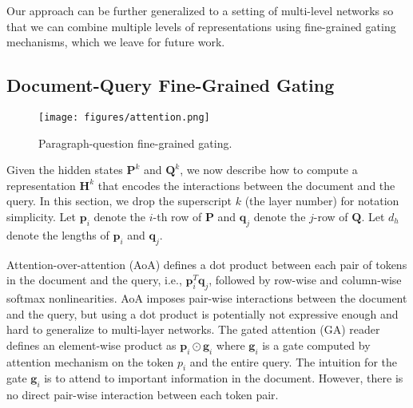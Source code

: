\documentclass{article} \usepackage{iclr2017_conference,times}
\begin{document}
Our approach can be further generalized to a setting of multi-level networks so that we can combine multiple levels of representations using fine-grained gating mechanisms, which we leave for future work.

\subsection{Document-Query Fine-Grained Gating} \label{sec:pq}

\begin{figure}[t]
\begin{center}
\texttt{[image: figures/attention.png]}
\end{center}
\caption{\small Paragraph-question fine-grained gating.}
\label{fig:dq}
\end{figure}

Given the hidden states $\mathbf{P}^k$ and $\mathbf{Q}^k$, we now describe how to compute a representation $\mathbf{H}^k$ that encodes the interactions between the document and the query. In this section, we drop the superscript $k$ (the layer number) for notation simplicity. Let $\mathbf{p}_i$ denote the $i$-th row of $\mathbf{P}$ and $\mathbf{q}_j$ denote the $j$-row of $\mathbf{Q}$. Let $d_h$ denote the lengths of $\mathbf{p}_i$ and $\mathbf{q}_j$.

Attention-over-attention (AoA) \citep{cui2016attention} defines a dot product between each pair of tokens in the document and the query, i.e., $\mathbf{p}_i^T \mathbf{q}_j$, followed by row-wise and column-wise softmax nonlinearities. AoA imposes pair-wise interactions between the document and the query, but using a dot product is potentially not expressive enough and hard to generalize to multi-layer networks. The gated attention (GA) reader \citep{dhingra2016gated} defines an element-wise product as $\mathbf{p}_i \odot \mathbf{g}_i$ where $\mathbf{g}_i$ is a gate computed by attention mechanism on the token $p_i$ and the entire query. The intuition for the gate $\mathbf{g}_i$ is to attend to important information in the document. However, there is no direct pair-wise interaction between each token pair.
\end{document}

